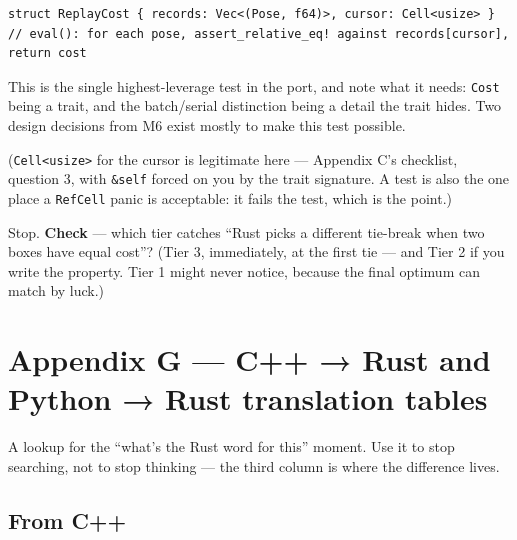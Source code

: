\documentclass[11pt]{article}
\begin{document}
\begin{verbatim}
struct ReplayCost { records: Vec<(Pose, f64)>, cursor: Cell<usize> }
// eval(): for each pose, assert_relative_eq! against records[cursor], return cost
\end{verbatim}

This is the single highest-leverage test in the port, and note what it needs:
\texttt{Cost} being a trait, and the batch/serial distinction being a detail the trait
hides. Two design decisions from M6 exist mostly to make this test possible.

(\texttt{Cell<usize>} for the cursor is legitimate here — Appendix C's checklist,
question 3, with \texttt{\&self} forced on you by the trait signature. A test is also
the one place a \texttt{RefCell} panic is acceptable: it fails the test, which is the
point.)

Stop. \textbf{\textbf{Check}} — which tier catches ``Rust picks a different tie-break when two
boxes have equal cost''? (Tier 3, immediately, at the first tie — and Tier 2 if
you write the property. Tier 1 might never notice, because the final optimum
can match by luck.)
\section{Appendix G — C++ → Rust and Python → Rust translation tables}
\label{sec:orgb8611bf}

A lookup for the ``what's the Rust word for this'' moment. Use it to stop
searching, not to stop thinking — the third column is where the difference
lives.
\subsection{From C++}
\label{sec:org1cfde3b}
\end{document}
